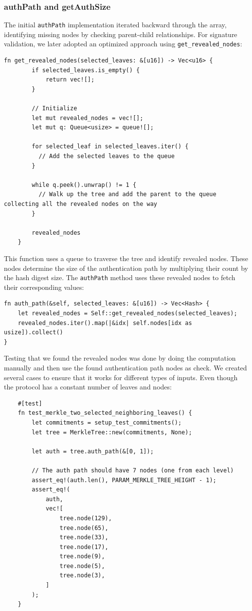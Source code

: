 \documentclass[11pt]{report}
\theoremstyle{definition}
\theoremstyle{plain}
\begin{document}
\subsubsection{authPath and getAuthSize}\label{sub:auth_path}
The initial \texttt{authPath} implementation iterated backward through the array, identifying missing nodes by checking parent-child relationships. For signature validation, we later adopted an optimized approach using \texttt{get\_revealed\_nodes}:
\begin{verbatim}
fn get_revealed_nodes(selected_leaves: &[u16]) -> Vec<u16> {
        if selected_leaves.is_empty() {
            return vec![];
        }

        // Initialize
        let mut revealed_nodes = vec![];
        let mut q: Queue<usize> = queue![];

        for selected_leaf in selected_leaves.iter() {
          // Add the selected leaves to the queue
        }

        while q.peek().unwrap() != 1 {
          // Walk up the tree and add the parent to the queue collecting all the revealed nodes on the way
        }

        revealed_nodes
    }

\end{verbatim}
This function uses a queue to traverse the tree and identify revealed nodes. These nodes determine the size of the authentication path by multiplying their count by the hash digest size. The \texttt{authPath} method uses these revealed nodes to fetch their corresponding values:
\begin{verbatim}
fn auth_path(&self, selected_leaves: &[u16]) -> Vec<Hash> {
    let revealed_nodes = Self::get_revealed_nodes(selected_leaves);
    revealed_nodes.iter().map(|&idx| self.nodes[idx as usize]).collect()
}
\end{verbatim}
Testing that we found the revealed nodes was done by doing the computation manually and then use the found authentication path nodes as check. We created several cases to ensure that it works for different types of inputs. Even though the protocol has a constant number of leaves and nodes:
\begin{verbatim}
    #[test]
    fn test_merkle_two_selected_neighboring_leaves() {
        let commitments = setup_test_commitments();
        let tree = MerkleTree::new(commitments, None);

        let auth = tree.auth_path(&[0, 1]);

        // The auth path should have 7 nodes (one from each level)
        assert_eq!(auth.len(), PARAM_MERKLE_TREE_HEIGHT - 1);
        assert_eq!(
            auth,
            vec![
                tree.node(129),
                tree.node(65),
                tree.node(33),
                tree.node(17),
                tree.node(9),
                tree.node(5),
                tree.node(3),
            ]
        );
    }
\end{verbatim}
\end{document}
